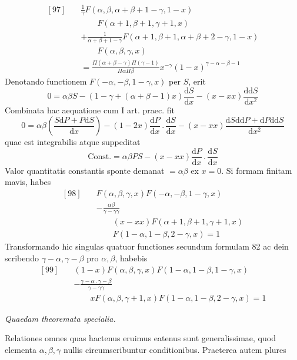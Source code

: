 \[
\begin{aligned}
{}[97]\quad&\frac1\gamma F(\alpha,\beta,\alpha+\beta+1-\gamma,1-x)\\&\qquad F(\alpha+1,\beta+1,\gamma+1,x)\\
&+\frac1{\alpha+\beta+1-\gamma}F(\alpha+1,\beta+1,\alpha+\beta+2-\gamma,1-x)\\&\qquad F(\alpha,\beta,\gamma,x)\\
&=\frac{\Pi(\alpha+\beta-\gamma)\Pi(\gamma-1)}{\Pi\alpha\Pi\beta}x^{-\gamma}(1-x)^{\gamma-\alpha-\beta-1}
\end{aligned}
\]
Denotando functionem $F(-\alpha,-\beta,1-\gamma,x)$ per $S$, erit
\[
0=\alpha\beta S-(1-\gamma+(\alpha+\beta-1)x)\frac{\mathrm dS}{\mathrm dx}-(x-xx)\frac{\mathrm{dd}S}{\mathrm dx^2}
\]
Combinata hac aequatione cum I art. praec. fit
\[
0=\alpha\beta\left(\frac{S\mathrm dP+P\mathrm dS}{\mathrm dx}\right)
-(1-2x)\frac{\mathrm dP}{\mathrm dx}\mathbin{.}\frac{\mathrm dS}{\mathrm dx}
-(x-xx)\frac{\mathrm dS\mathrm{dd}P+\mathrm dP\mathrm{dd}S}{\mathrm dx^2}
\]
quae est integrabilis atque suppeditat
\[
\mathrm{Const.}=\alpha\beta PS-(x-xx)\frac{\mathrm dP}{\mathrm dx}\mathbin{.}\frac{\mathrm dS}{\mathrm dx}
\]
Valor quantitatis constantis sponte demanat $=\alpha\beta$ ex $x=0$. Si formam finitam mavis, habes
\[
\begin{aligned}
{}[98]\quad&F(\alpha,\beta,\gamma,x)F(-\alpha,-\beta,1-\gamma,x)\\
&-\frac{\alpha\beta}{\gamma-\gamma\gamma}\\&\qquad(x-xx)F(\alpha+1,\beta+1,\gamma+1,x)\\&\qquad F(1-\alpha,1-\beta,2-\gamma,x)=1
\end{aligned}
\]
Transformando hic singulas quatuor functiones secundum formulam 82 ac
dein scribendo $\gamma-\alpha,\gamma-\beta$ pro $\alpha,\beta$, habebis
\[
\begin{aligned}
{}[99]\quad&(1-x)F(\alpha,\beta,\gamma,x)F(1-\alpha,1-\beta,1-\gamma,x)\\
&-\frac{\gamma-\alpha\mathbin{.}\gamma-\beta}{\gamma-\gamma\gamma}\\&\qquad xF(\alpha,\beta,\gamma+1,x)F(1-\alpha,1-\beta,2-\gamma,x)=1
\end{aligned}
\]
\begin{center}\textit{Quaedam theoremata specialia.}\end{center}
Relationes omnes quas hactenus eruimus eatenus sunt generalissimae, quod
elementa $\alpha,\beta,\gamma$ nullis circumscribuntur conditionibus. Praeterea autem plures
